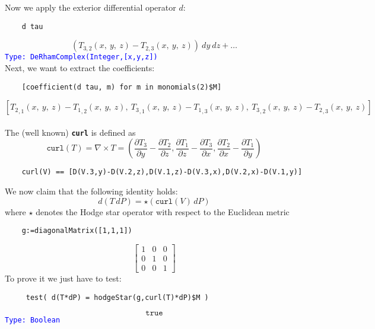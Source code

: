 \documentclass[12pt,a4paper]{article}
\newcommand{\type}[1]{\textcolor{blue}{\tt\tiny #1}}
\begin{document}
Now we apply the exterior differential operator $d$:
\begin{lstlisting}
    d tau
\end{lstlisting}
\begin{displaymath}
    \left( T_{3,2}\left(x, \: y, \: z\right)
    -T_{2,3}\left(x, \: y, \: z\right)\right)
    \ dy \ dz + \ldots
\end{displaymath}
\type{Type: DeRhamComplex(Integer,[x,y,z])}
\\
Next, we want to extract the coefficients:
\begin{lstlisting}
    [coefficient(d tau, m) for m in monomials(2)$M]
\end{lstlisting}
\begin{displaymath}
\scriptstyle{
    \left[{{{{T _ {2}} _ {{,1}}}\left({x, \: y, \: z}\right)}
    -{{{T _ {1}} _ {{,2}}}\left( {x, \: y, \: z}\right)}},
    \: {{{{T _ {3}} _ {{,1}}}\left({x, \: y, \: z}\right)}
    -{{{T _ {1}} _ {{,3}}}\left({x, \: y, \: z}\right)}},
    \: {{{{T _ {3}} _ {{,2}}}\left({x, \: y, \: z}
    \right)} -{{{T _ {2}} _ {{,3}}}\left({x, \: y, \: z}\right)}}
    \right]}
\end{displaymath}
\\    
The (well known) {\tt\bf curl} is defined as
\begin{displaymath}
    \mathtt{curl}(T) =\nabla\times T= \scriptstyle{
    \left(
    \frac{\partial T_3}{\partial y} - \frac{\partial T_2}{\partial z},
    \frac{\partial T_1}{\partial z} - \frac{\partial T_3}{\partial x},
    \frac{\partial T_2}{\partial x} - \frac{\partial T_1}{\partial y}
    \right)}
\end{displaymath}
\begin{lstlisting}
    curl(V) == [D(V.3,y)-D(V.2,z),D(V.1,z)-D(V.3,x),D(V.2,x)-D(V.1,y)]
\end{lstlisting}
We now claim that the following identity holds:
\begin{displaymath}
     d (T\, dP) =  \star(\mathtt{curl}(V)\, dP)
\end{displaymath}
where $\star$ denotes the Hodge star operator with respect to the Euclidean
metric
\begin{lstlisting}
    g:=diagonalMatrix([1,1,1])
\end{lstlisting}
\begin{displaymath}
   \left[
   \begin{array}{ccc}
   1 & 0 & 0 \\
   0 & 1 & 0 \\
   0 & 0 & 1
   \end{array}
   \right]
\end{displaymath}
To prove it we just have to test:
\begin{lstlisting}
     test( d(T*dP) = hodgeStar(g,curl(T)*dP)$M )
\end{lstlisting}
\begin{displaymath}
    \mathtt{true}
\end{displaymath}
\type{Type: Boolean}
%
\end{document}
